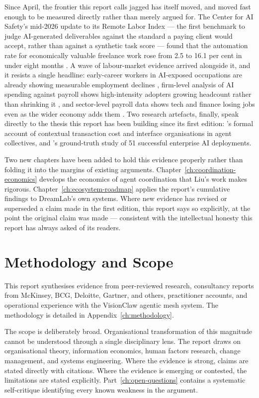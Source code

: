 Since April, the frontier this report calls jagged has itself moved, and moved fast enough to be measured directly rather than merely argued for. The Center for AI Safety's mid-2026 update to its Remote Labor Index --- the first benchmark to judge AI-generated deliverables against the standard a paying client would accept, rather than against a synthetic task score --- found that the automation rate for economically valuable freelance work rose from 2.5 to 16.1 per cent in under eight months \parencite{CAIS2026RLI}. A wave of labour-market evidence arrived alongside it, and it resists a single headline: early-career workers in AI-exposed occupations are already showing measurable employment declines \parencite{Brynjolfsson2025Canaries}, firm-level analysis of AI spending against payroll shows high-intensity adopters growing headcount rather than shrinking it \parencite{RampRevelio2026}, and sector-level payroll data shows tech and finance losing jobs even as the wider economy adds them \parencite{Challenger2026}. Two research artefacts, finally, speak directly to the thesis this report has been building since its first edition: \textcite{Liu2026}'s formal account of contextual transaction cost and interface organisations in agent collectives, and \textcite{Pereira2026Playbook}'s ground-truth study of 51 successful enterprise AI deployments.

Two new chapters have been added to hold this evidence properly rather than folding it into the margins of existing arguments. Chapter~\ref{ch:coordination-economics} develops the economics of agent coordination that Liu's work makes rigorous. Chapter~\ref{ch:ecosystem-roadmap} applies the report's cumulative findings to DreamLab's own systems. Where new evidence has revised or superseded a claim made in the first edition, this report says so explicitly, at the point the original claim was made --- consistent with the intellectual honesty this report has always asked of its readers.

\section{Methodology and Scope}

This report synthesises evidence from peer-reviewed research, consultancy reports from McKinsey, BCG, Deloitte, Gartner, and others, practitioner accounts, and operational experience with the VisionClaw agentic mesh system. The methodology is detailed in Appendix~\ref{ch:methodology}.

The scope is deliberately broad. Organisational transformation of this magnitude cannot be understood through a single disciplinary lens. The report draws on organisational theory, information economics, human factors research, change management, and systems engineering. Where the evidence is strong, claims are stated directly with citations. Where the evidence is emerging or contested, the limitations are stated explicitly. Part~\ref{ch:open-questions} contains a systematic self-critique identifying every known weakness in the argument.

